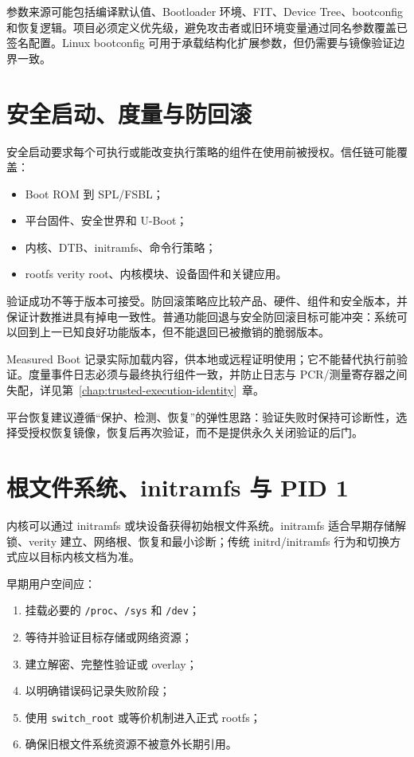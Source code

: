 参数来源可能包括编译默认值、Bootloader 环境、FIT、Device Tree、bootconfig 和恢复逻辑。项目必须定义优先级，避免攻击者或旧环境变量通过同名参数覆盖已签名配置。Linux bootconfig 可用于承载结构化扩展参数，但仍需要与镜像验证边界一致\cite{linux-bootconfig}。

\section{安全启动、度量与防回滚}

安全启动要求每个可执行或能改变执行策略的组件在使用前被授权。信任链可能覆盖：

\begin{itemize}
  \item Boot ROM 到 SPL/FSBL；
  \item 平台固件、安全世界和 U-Boot；
  \item 内核、DTB、initramfs、命令行策略；
  \item rootfs verity root、内核模块、设备固件和关键应用。
\end{itemize}

验证成功不等于版本可接受。防回滚策略应比较产品、硬件、组件和安全版本，并保证计数推进具有掉电一致性。普通功能回退与安全防回滚目标可能冲突：系统可以回到上一已知良好功能版本，但不能退回已被撤销的脆弱版本。

Measured Boot 记录实际加载内容，供本地或远程证明使用；它不能替代执行前验证。度量事件日志必须与最终执行组件一致，并防止日志与 PCR/测量寄存器之间失配，详见第~\ref{chap:trusted-execution-identity}~章。

平台恢复建议遵循“保护、检测、恢复”的弹性思路\cite{nist-platform-resiliency}：验证失败时保持可诊断性，选择受授权恢复镜像，恢复后再次验证，而不是提供永久关闭验证的后门。

\section{根文件系统、initramfs 与 PID 1}

内核可以通过 initramfs 或块设备获得初始根文件系统。initramfs 适合早期存储解锁、verity 建立、网络根、恢复和最小诊断；传统 initrd/initramfs 行为和切换方式应以目标内核文档为准\cite{linux-initrd}。

早期用户空间应：

\begin{enumerate}
  \item 挂载必要的 \texttt{/proc}、\texttt{/sys} 和 \texttt{/dev}；
  \item 等待并验证目标存储或网络资源；
  \item 建立解密、完整性验证或 overlay；
  \item 以明确错误码记录失败阶段；
  \item 使用 \texttt{switch\_root} 或等价机制进入正式 rootfs；
  \item 确保旧根文件系统资源不被意外长期引用。
\end{enumerate}

